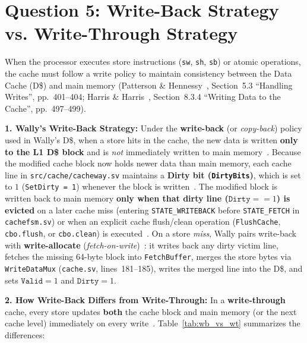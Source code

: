 \documentclass[11pt,a4paper]{article}
\begin{document}

\section{Question 5: Write-Back Strategy vs. Write-Through Strategy}

When the processor executes store instructions (\texttt{sw}, \texttt{sh}, \texttt{sb}) or atomic operations, the cache must follow a write policy to maintain consistency between the Data Cache (D\$) and main memory (Patterson \& Hennessy~\cite{patterson2020}, Section~5.3 ``Handling Writes'', pp.~401--404; Harris \& Harris~\cite{harris2021}, Section~8.3.4 ``Writing Data to the Cache'', pp.~497--499).

\textbf{1. Wally's Write-Back Strategy:}
Under the \textbf{write-back} (or \emph{copy-back}) policy used in Wally's D\$, when a store hits in the cache, the new data is written \textbf{only to the L1 D\$ block} and is \emph{not} immediately written to main memory~\cite{patterson2020,harris2021}. Because the modified cache block now holds newer data than main memory, each cache line in \texttt{src/cache/cacheway.sv} maintains a \textbf{Dirty bit (\texttt{DirtyBits})}, which is set to $1$ (\texttt{SetDirty = 1}) whenever the block is written~\cite{patterson2020,harris2021}. The modified block is written back to main memory \textbf{only when that dirty line ($\texttt{Dirty} == 1$) is evicted} on a later cache miss (entering \texttt{STATE\_WRITEBACK} before \texttt{STATE\_FETCH} in \texttt{cachefsm.sv}) or when an explicit cache flush/clean operation (\texttt{FlushCache}, \texttt{cbo.flush}, or \texttt{cbo.clean}) is executed~\cite{harris2021,wallydoc}. On a store \emph{miss}, Wally pairs write-back with \textbf{write-allocate} (\emph{fetch-on-write})~\cite{patterson2020,harris2021}: it writes back any dirty victim line, fetches the missing 64-byte block into \texttt{FetchBuffer}, merges the store bytes via \texttt{WriteDataMux} (\texttt{cache.sv}, lines~181--185), writes the merged line into the D\$, and sets $\texttt{Valid} = 1$ and $\texttt{Dirty} = 1$.

\textbf{2. How Write-Back Differs from Write-Through:}
In a \textbf{write-through} cache, every store updates \textbf{both} the cache block and main memory (or the next cache level) immediately on every write~\cite{patterson2020,harris2021}. Table~\ref{tab:wb_vs_wt} summarizes the differences:
\end{document}
